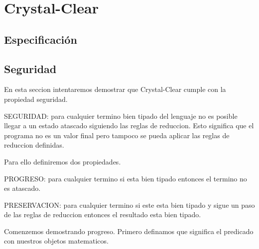 \setchapterpreamble[u]{\margintoc}
\chapter{Crystal-Clear}

\section{Especificación}

\section{Seguridad}

En esta seccion intentaremos demostrar que Crystal-Clear cumple con la propiedad
seguridad.

\begin{definition}
    SEGURIDAD: para cualquier termino bien tipado del lenguaje no es
    posible llegar a un estado atascado siguiendo las reglas de reduccion.
     Esto significa que el programa no es un valor final pero tampoco se 
    pueda aplicar las reglas de reduccion definidas.
\end{definition}

Para ello definiremos dos propiedades.

\begin{definition}
    PROGRESO: para cualquier termino si esta bien tipado entonces el termino no es atascado.
\end{definition}
\begin{definition}
    PRESERVACION: para cualquier termino si este esta bien tipado y sigue un paso de las reglas
    de reduccion entonces el resultado esta bien tipado.
\end{definition}

Comenzemos demostrando progreso. Primero definamos que significa el predicado
con nuestros objetos matematicos.

